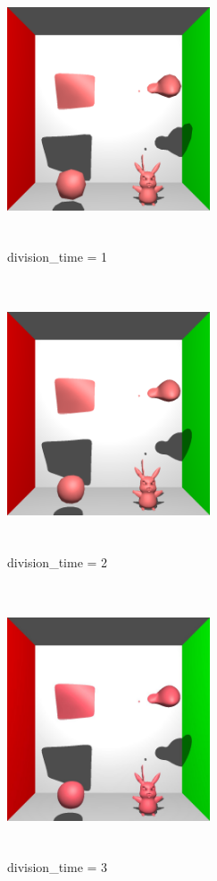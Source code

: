 \documentclass[acmtog]{acmart}
\begin{document}
\begin{figure}[h]
\centering
\includegraphics[width=6cm,height=8cm]{subdivision1.png}
\caption{division\_time = 1}
\end{figure}

\begin{figure}[h]
\centering
\includegraphics[width=6cm,height=8cm]{subdivision2.png}
\caption{division\_time = 2}
\end{figure}

\begin{figure}[h]
\centering
\includegraphics[width=6cm,height=8cm]{final.jpg}
\caption{division\_time = 3}
\end{figure}
\end{document}
